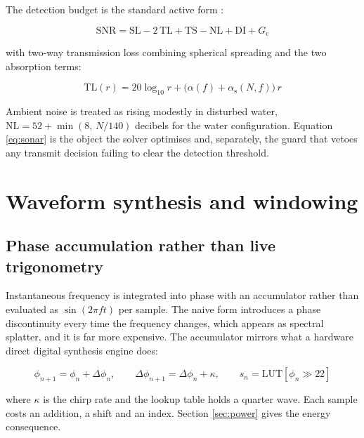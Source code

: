 \documentclass[11pt,a4paper]{article}
\begin{document}
The detection budget is the standard active form \cite{urick1983}:

\begin{equation}
\mathrm{SNR} = \mathrm{SL} - 2\,\mathrm{TL} + \mathrm{TS}
             - \mathrm{NL} + \mathrm{DI} + G_{\text{c}}
\label{eq:sonar}
\end{equation}

with two-way transmission loss combining spherical spreading and the two
absorption terms:

\begin{equation}
\mathrm{TL}(r) = 20\log_{10} r + \bigl(\alpha(f) + \alpha_{\text{s}}(N,f)\bigr)\,r
\label{eq:tl}
\end{equation}

Ambient noise is treated as rising modestly in disturbed water,
$\mathrm{NL} = 52 + \min(8,\,N/140)$ decibels for the water configuration.
Equation \eqref{eq:sonar} is the object the solver optimises and, separately,
the guard that vetoes any transmit decision failing to clear the detection
threshold.

\section{Waveform synthesis and windowing}
\label{sec:synthesis}

\subsection{Phase accumulation rather than live trigonometry}

Instantaneous frequency is integrated into phase with an accumulator rather
than evaluated as $\sin(2\pi f t)$ per sample. The naive form introduces a
phase discontinuity every time the frequency changes, which appears as spectral
splatter, and it is far more expensive. The accumulator mirrors what a hardware
direct digital synthesis engine does:

\begin{equation}
\phi_{n+1} = \phi_{n} + \Delta\phi_{n}, \qquad
\Delta\phi_{n+1} = \Delta\phi_{n} + \kappa, \qquad
s_n = \mathrm{LUT}\!\left[\phi_n \gg 22\right]
\label{eq:dds}
\end{equation}

where $\kappa$ is the chirp rate and the lookup table holds a quarter wave. Each
sample costs an addition, a shift and an index. Section \ref{sec:power} gives
the energy consequence.
\end{document}
